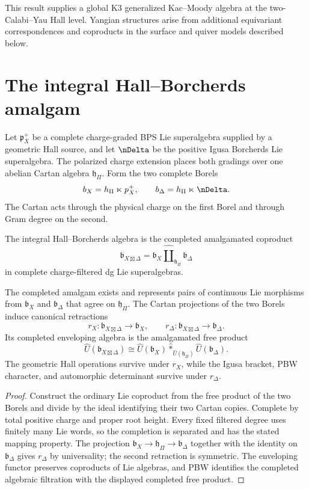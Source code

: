 This result supplies a global K3 generalized Kac--Moody algebra at the two-Calabi--Yau Hall level. Yangian structures arise from additional equivariant correspondences and coproducts in the surface and quiver models described below.

\chapter{The integral Hall--Borcherds amalgam}
Let $\mathfrak p_X^+$ be a complete charge-graded BPS Lie superalgebra supplied by a geometric Hall source, and let $\nDelta$ be the positive Igusa Borcherds Lie superalgebra.  The polarized charge extension places both gradings over one abelian Cartan algebra $\mathfrak h_\Pi$.  Form the two complete Borels
\[
 \mathfrak b_X=\mathfrak h_\Pi\ltimes\mathfrak p_X^+,
 \qquad
 \mathfrak b_\Delta=\mathfrak h_\Pi\ltimes\nDelta.
\]
The Cartan acts through the physical charge on the first Borel and through Gram degree on the second.

\begin{definition}
The integral Hall--Borcherds algebra is the completed amalgamated coproduct
\[
 \mathfrak b_{X\boxtimes\Delta}
 =\mathfrak b_X
  \widehat\amalg_{\mathfrak h_\Pi}
  \mathfrak b_\Delta
\]
in complete charge-filtered dg Lie superalgebras.
\end{definition}

\begin{theorem}
The completed amalgam exists and represents pairs of continuous Lie morphisms from $\mathfrak b_X$ and $\mathfrak b_\Delta$ that agree on $\mathfrak h_\Pi$.  The Cartan projections of the two Borels induce canonical retractions
\[
 r_X:\mathfrak b_{X\boxtimes\Delta}\longrightarrow\mathfrak b_X,
 \qquad
 r_\Delta:\mathfrak b_{X\boxtimes\Delta}\longrightarrow\mathfrak b_\Delta.
\]
Its completed enveloping algebra is the amalgamated free product
\[
 \widehat U(\mathfrak b_{X\boxtimes\Delta})
 \cong
 \widehat U(\mathfrak b_X)
 \widehat *_{\widehat U(\mathfrak h_\Pi)}
 \widehat U(\mathfrak b_\Delta).
\]
The geometric Hall operations survive under $r_X$, while the Igusa bracket, PBW character, and automorphic determinant survive under $r_\Delta$.
\end{theorem}
\begin{proof}
Construct the ordinary Lie coproduct from the free product of the two Borels and divide by the ideal identifying their two Cartan copies.  Complete by total positive charge and proper root height.  Every fixed filtered degree uses finitely many Lie words, so the completion is separated and has the stated mapping property.  The projection $\mathfrak b_X\to\mathfrak h_\Pi\to\mathfrak b_\Delta$ together with the identity on $\mathfrak b_\Delta$ gives $r_\Delta$ by universality; the second retraction is symmetric.  The enveloping functor preserves coproducts of Lie algebras, and PBW identifies the completed algebraic filtration with the displayed completed free product.
\end{proof}

